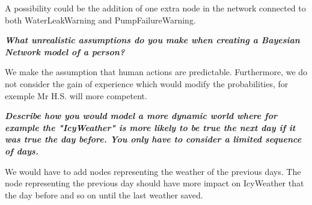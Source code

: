 \vspace{1em}
A possibility could be the addition of one extra node in the network connected
to both WaterLeakWarning and PumpFailureWarning.


\textit{\textbf{What unrealistic assumptions do you make when creating a
Bayesian Network model of a person?}}

\vspace{1em}
We make the assumption that human actions are predictable. Furthermore, we do not
consider the gain of experience which would modify the probabilities, for exemple
Mr H.S. will more competent.

\textit{\textbf{Describe how you would model a more dynamic world where for
 example the "IcyWeather" is more likely to be true the next day if it was
 true the day before. You only have to consider a limited sequence of days.}}

 \vspace{1em}
We would have to add nodes representing the weather of the previous days.
The node representing the previous day should have more impact on IcyWeather that
the day before and so on until the last weather saved.
\thispagestyle{empty}

\newpage
\thispagestyle{empty}
